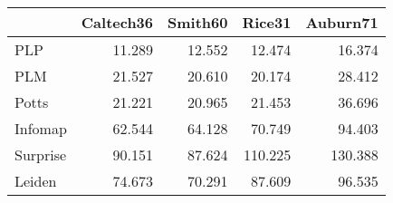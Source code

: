 \begin{tabular}{lrrrr}
\toprule
{} & Caltech36 & Smith60 &  Rice31 & Auburn71 \\
\midrule
PLP      &    11.289 &  12.552 &  12.474 &   16.374 \\
PLM      &    21.527 &  20.610 &  20.174 &   28.412 \\
Potts    &    21.221 &  20.965 &  21.453 &   36.696 \\
Infomap  &    62.544 &  64.128 &  70.749 &   94.403 \\
Surprise &    90.151 &  87.624 & 110.225 &  130.388 \\
Leiden   &    74.673 &  70.291 &  87.609 &   96.535 \\
\bottomrule
\end{tabular}
